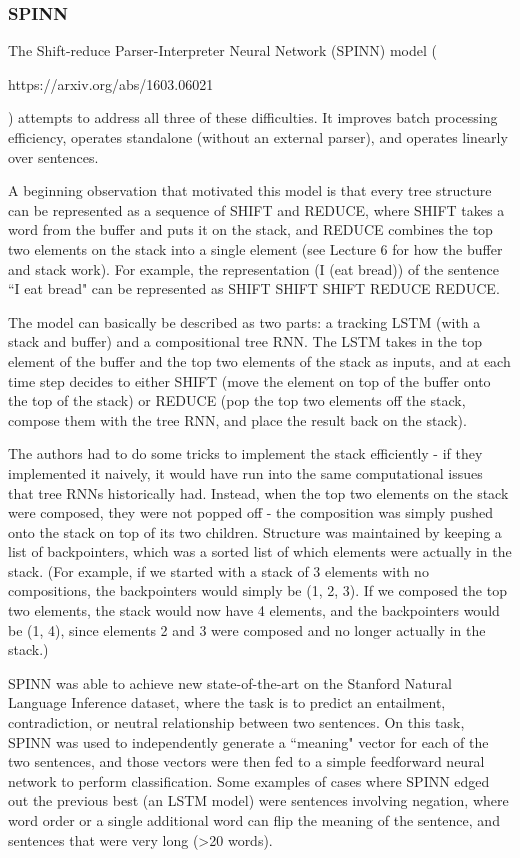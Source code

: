 \subsubsection{SPINN}

The Shift-reduce Parser-Interpreter Neural Network (SPINN) model (\begin{tt}https://arxiv.org/abs/1603.06021 \end{tt}) attempts to address all three of these difficulties. It improves batch processing efficiency, operates standalone (without an external parser), and operates linearly over sentences. 

A beginning observation that motivated this model is that every tree structure can be represented as a sequence of SHIFT and REDUCE, where SHIFT takes a word from the buffer and puts it on the stack, and REDUCE combines the top two elements on the stack into a single element (see Lecture 6 for how the buffer and stack work). For example, the representation (I (eat bread)) of the sentence ``I eat bread" can be represented as SHIFT SHIFT SHIFT REDUCE REDUCE.

The model can basically be described as two parts: a tracking LSTM (with a stack and buffer) and a compositional tree RNN. The LSTM takes in the top element of the buffer and the top two elements of the stack as inputs, and at each time step decides to either SHIFT (move the element on top of the buffer onto the top of the stack) or REDUCE (pop the top two elements off the stack, compose them with the tree RNN, and place the result back on the stack).

The authors had to do some tricks to implement the stack efficiently - if they implemented it naively, it would have run into the same computational issues that tree RNNs historically had. Instead, when the top two elements on the stack were composed, they were not popped off - the composition was simply pushed onto the stack on top of its two children. Structure was maintained by keeping a list of backpointers, which was a sorted list of which elements were actually in the stack. (For example, if we started with a stack of 3 elements with no compositions, the backpointers would simply be (1, 2, 3). If we composed the top two elements, the stack would now have 4 elements, and the backpointers would be (1, 4), since elements 2 and 3 were composed and no longer actually in the stack.)

SPINN was able to achieve new state-of-the-art on the Stanford Natural Language Inference dataset, where the task is to predict an entailment, contradiction, or neutral relationship between two sentences. On this task, SPINN was used to independently generate a ``meaning" vector for each of the two sentences, and those vectors were then fed to a simple feedforward neural network to perform classification. Some examples of cases where SPINN edged out the previous best (an LSTM model) were sentences involving negation, where word order or a single additional word can flip the meaning of the sentence, and sentences that were very long (\textgreater 20 words).

